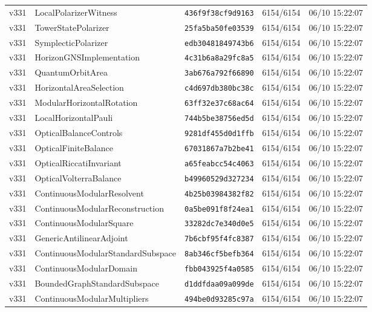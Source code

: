 \documentclass[11pt]{article}
\theoremstyle{definition}\newtheorem{deriv}{Derivation}
\begin{document}
{\begin{longtable}{@{}lllll@{}}
v331 & LocalPolarizerWitness & \texttt{436f9f38cf9d9163} & 6154/6154 & 06/10 15:22:07 \\
v331 & TowerStatePolarizer & \texttt{25fa5ba50fe03539} & 6154/6154 & 06/10 15:22:07 \\
v331 & SymplecticPolarizer & \texttt{edb30481849743b6} & 6154/6154 & 06/10 15:22:07 \\
v331 & HorizonGNSImplementation & \texttt{4c31b6a8a29fc8a5} & 6154/6154 & 06/10 15:22:07 \\
v331 & QuantumOrbitArea & \texttt{3ab676a792f66890} & 6154/6154 & 06/10 15:22:07 \\
v331 & HorizontalAreaSelection & \texttt{c4d697db380bc38c} & 6154/6154 & 06/10 15:22:07 \\
v331 & ModularHorizontalRotation & \texttt{63ff32e37c68ac64} & 6154/6154 & 06/10 15:22:07 \\
v331 & LocalHorizontalPauli & \texttt{744b5be38756ed5d} & 6154/6154 & 06/10 15:22:07 \\
v331 & OpticalBalanceControls & \texttt{9281df455d0d1ffb} & 6154/6154 & 06/10 15:22:07 \\
v331 & OpticalFiniteBalance & \texttt{67031867a7b2be41} & 6154/6154 & 06/10 15:22:07 \\
v331 & OpticalRiccatiInvariant & \texttt{a65feabcc54c4063} & 6154/6154 & 06/10 15:22:07 \\
v331 & OpticalVolterraBalance & \texttt{b49960529d327234} & 6154/6154 & 06/10 15:22:07 \\
v331 & ContinuousModularResolvent & \texttt{4b25b03984382f82} & 6154/6154 & 06/10 15:22:07 \\
v331 & ContinuousModularReconstruction & \texttt{0a5be091f8f24ea1} & 6154/6154 & 06/10 15:22:07 \\
v331 & ContinuousModularSquare & \texttt{33282dc7e340d0e5} & 6154/6154 & 06/10 15:22:07 \\
v331 & GenericAntilinearAdjoint & \texttt{7b6cbf95f4fc8387} & 6154/6154 & 06/10 15:22:07 \\
v331 & ContinuousModularStandardSubspace & \texttt{8ab346cf5befb364} & 6154/6154 & 06/10 15:22:07 \\
v331 & ContinuousModularDomain & \texttt{fbb043925f4a0585} & 6154/6154 & 06/10 15:22:07 \\
v331 & BoundedGraphStandardSubspace & \texttt{d1ddfdaa09a099de} & 6154/6154 & 06/10 15:22:07 \\
v331 & ContinuousModularMultipliers & \texttt{494be0d93285c97a} & 6154/6154 & 06/10 15:22:07 \\

\end{longtable}}
\end{document}
